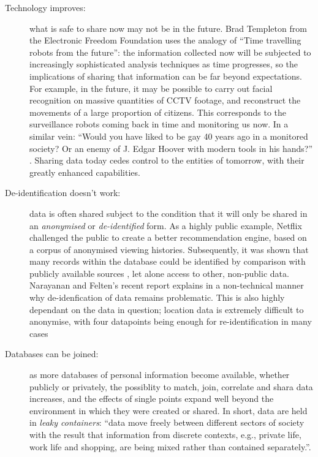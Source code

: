 \documentclass{IOS-Book-Article}     %
\begin{document}
\begin{description}
\item[Technology improves:] what is safe to share now may not be in the
future. Brad Templeton from the Electronic Freedom Foundation uses the analogy
of ``Time travelling robots from the future'': the information collected now
will be subjected to increasingly sophisticated analysis techniques as time
progresses, so the implications of sharing that information can be far beyond
expectations. For example, in the future, it may be possible to carry out facial
recognition on massive quantities of CCTV footage, and reconstruct the movements
of a large proportion of citizens. This corresponds to the surveillance
robots coming back in time and monitoring us now. In a similar vein: ``Would
you have liked to be gay 40 years ago in a monitored society? Or an enemy of J.
Edgar Hoover with modern tools in his hands?'' \cite{templetonWatched}. Sharing
data today cedes control to the entities of tomorrow, with their greatly
enhanced capabilities.
\item[De-identification doesn't work:] data is often shared subject to the
condition that it will only be shared in an \emph{anonymised} or
\emph{de-identified} form. As a highly public example, Netflix challenged the
public to create a better recommendation engine, based on a corpus of anonymised
viewing histories. Subsequently, it was shown that many records within the
database could be identified by comparison with publicly available
sources \cite{narayanan2008Deanon}, let alone access to other, non-public data.
Narayanan and Felten's recent report \cite{narayanan2014Deidentification} explains in a non-technical manner why
de-idenfication of data remains problematic. This is also highly dependant on
the data in question; location data is extremely difficult to anonymise, with
four datapoints being enough for re-identification in many cases \cite{}
\item[Databases can be joined:] as more databases of personal information
become available, whether publicly or privately, the possiblity to match, join,
correlate and shara data increases, and the effects of single points expand well
beyond the environment in which they were created or shared. In short, data are
held in \emph{leaky containers}: ``data move freely between different sectors of
society with the result that information from discrete contexts, e.g.,
 private life, work life and shopping, are being mixed rather than contained 
 separately.''\cite[p.37--44]{lyon2001surveillance}.
\end{description}
\end{document}

